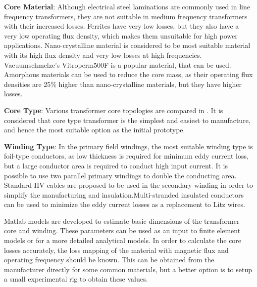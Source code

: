 \documentclass[a4paper, 11pt]{article} %
\begin{document}
\textbf{Core Material}: Although electrical steel laminations are commonly used in line frequency transformers, they are not suitable in medium frequency transformers with their increased losses. Ferrites have very low losses, but they also have a very low operating flux density, which makes them unsuitable for high power applications. Nano-crystalline material is considered to be most suitable material with its high flux density and very low losses at high frequencies. Vacuumschmelze's Vitroperm500F is a popular material, that can be used. Amorphous materials can be used to reduce the core mass, as their operating flux densities are 25\% higher than nano-crystalline materials, but they have higher losses.

\textbf{Core Type}: Various transformer core topologies are compared in \cite{Agheb2012}. It is considered that core type transformer is the simplest and easiest to manufacture, and hence the most suitable option as the initial prototype.

\textbf{Winding Type}: In the primary field windings, the most suitable winding type is foil-type conductors, as low thickness is required for minimum eddy current loss, but a large conductor area is required to conduct high input current. It is possible to use two parallel primary windings to double the conducting area. Standard HV cables are proposed to be used in the secondary winding in order to simplify the manufacturing and insulation.Multi-stranded insulated conductors can be used to minimize the eddy current losses as a replacement to Litz wires.

Matlab models are developed to estimate basic dimensions of the transformer core and winding. These parameters can be used as an input to finite element models or for a more detailed analytical models. In order to calculate the core losses accurately, the loss mapping of the material with magnetic flux and operating frequency should be known. This can be obtained from the manufacturer directly for some common materials, but a better option is to setup a small experimental rig to obtain these values.


\clearpage


\clearpage
\end{document}
